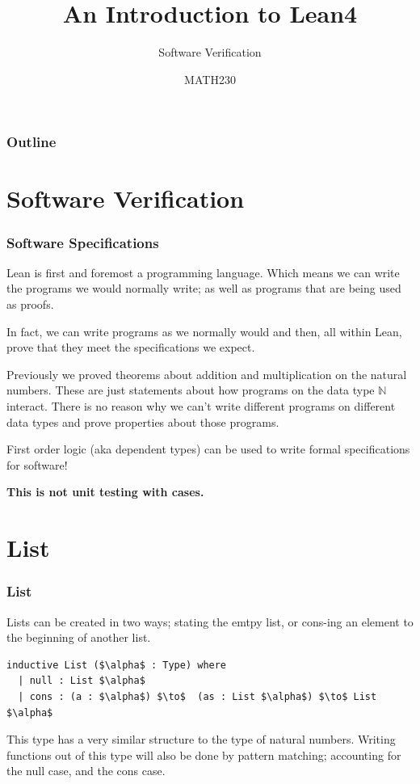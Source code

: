 \documentclass{beamer}
\title{An Introduction to Lean4}
\subtitle{Software Verification}
\author{MATH230}
\institute{School of Mathematics and Statistics \\ University of Canterbury}
\date{}
\theoremstyle{indentDefn} \newtheorem{defn}[]{Definition}
\begin{document}
\begin{frame}

  \titlepage

\end{frame}

\begin{frame}
  \frametitle{Outline}

  \tableofcontents

\end{frame}

\section{Software Verification}

\begin{frame}
	\frametitle{Software Specifications}
	
	Lean is first and foremost a programming language. Which means we can write the programs we would normally write; as well as programs that are being used as proofs. 
	
	In fact, we can write programs as we normally would and then, all within Lean, prove that they meet the specifications we expect. 
	
	Previously we proved theorems about addition and multiplication on the natural numbers. These are just statements about how programs on the data type $\mathbb{N}$ interact. There is no reason why we can't write different programs on different data types and prove properties about those programs. 
	
	First order logic (aka dependent types) can be used to write formal specifications for software!
	
	{\bf This is not unit testing with cases.}
\end{frame}

\section{List}
\begin{frame}[fragile]
	\frametitle{List}
	
	Lists can be created in two ways; stating the emtpy list, or cons-ing an element to the beginning of another list.
	
	\begin{lstlisting}[language=Lean]
inductive List ($\alpha$ : Type) where
  | null : List $\alpha$
  | cons : (a : $\alpha$) $\to$  (as : List $\alpha$) $\to$ List $\alpha$
	\end{lstlisting}
	
	\vspace{40mm}
	
	This type has a very similar structure to the type of natural numbers. Writing functions out of this type will also be done by pattern matching; accounting for the null case, and the cons case.
\end{frame}
\end{document}
